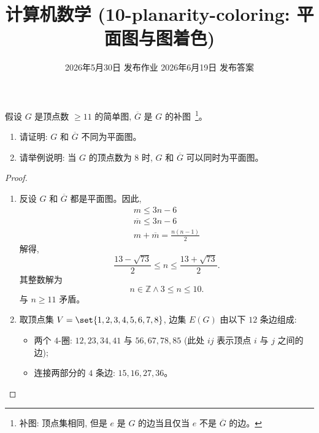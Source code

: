 \documentclass[a4paper, justified]{tufte-handout}
\title{计算机数学 (10-planarity-coloring: 平面图与图着色)}
\date{2026年5月30日 发布作业 \qquad 2026年6月19日 发布答案}
\begin{document}
\maketitle
\noplagiarism %
\begin{abstract}
\end{abstract}
\beginrequired

\begin{problem}[平面图]
  假设 $G$ 是顶点数 $\ge 11$ 的简单图, $\overline{G}$ 是 $G$ 的补图~\footnote{
    补图: 顶点集相同, 但是 $e$ 是 $G$ 的边当且仅当 $e$ 不是 $\overline{G}$ 的边。
  }。

  \begin{enumerate}[(1)]
    \item 请证明: $G$ 和 $\overline{G}$ 不同为平面图。
    \item 请举例说明: 当 $G$ 的顶点数为 $8$ 时,
      $G$ 和 $\overline{G}$ 可以同时为平面图。
  \end{enumerate}
\end{problem}

\begin{proof}
  \begin{enumerate}[(1)]
    \item 反设 $G$ 和 $\overline{G}$ 都是平面图。因此,
      \begin{align}
        m \le 3n - 6 \\
        \overline{m} \le 3n - 6 \\
        m + \overline{m} = \frac{n(n-1)}{2}
      \end{align}
      解得,
      \[
        \frac{13 -\sqrt{73}}{2} \le n \le \frac{13 + \sqrt{73}}{2}.
      \]
      其整数解为
      \[
        n \in \mathbb{Z} \land 3 \le n \le 10.
      \]
      与 $n \ge 11$ 矛盾。

    \item 取顶点集 $V = \set{1,2,3,4,5,6,7,8}$, 边集 $E(G)$ 由以下 $12$ 条边组成:
      \begin{itemize}
        \item 两个 $4$-圈: $12, 23, 34, 41$ 与 $56, 67, 78, 85$
          (此处 $ij$ 表示顶点 $i$ 与 $j$ 之间的边);
        \item 连接两部分的 $4$ 条边: $15, 16, 27, 36$。
      \end{itemize}
  \end{enumerate}
\end{proof}
\end{document}
